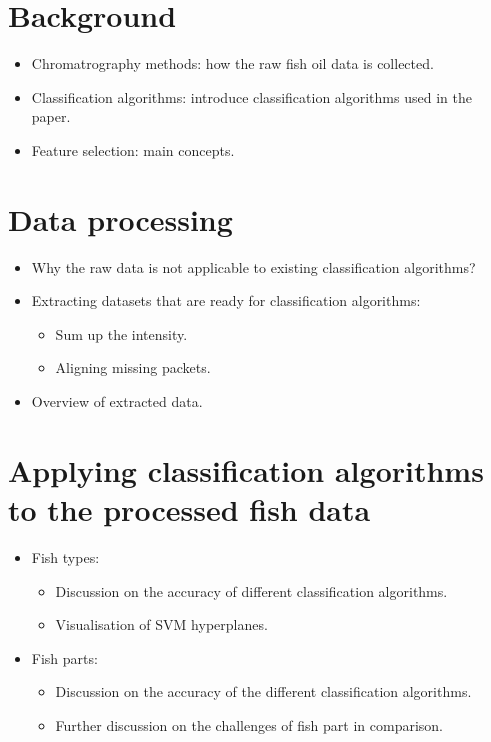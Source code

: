 \documentclass[runningheads]{llncs}
\begin{document}
\section{Background}

\begin{itemize}
    \item Chromatrography methods: how the raw fish oil data is collected. 
    \item Classification algorithms: introduce classification algorithms used in the paper. 
    \item Feature selection: main concepts. 
\end{itemize}

\section{Data processing}

\begin{itemize}
    \item Why the raw data is not applicable to existing classification algorithms? 
    \item Extracting datasets that are ready for classification algorithms: 
    \begin{itemize}
        \item Sum up the intensity. 
        \item Aligning missing packets. 
    \end{itemize}
    \item Overview of extracted data.
\end{itemize}

\section{Applying classification algorithms to the processed fish data}

\begin{itemize}
    \item Fish types: 
    \begin{itemize}
        \item Discussion on the accuracy of different classification algorithms. 
        \item Visualisation of SVM hyperplanes. 
    \end{itemize}
    \item Fish parts: 
    \begin{itemize}
        \item Discussion on the accuracy of the different classification algorithms. 
        \item Further discussion on the challenges of fish part in comparison. 
    \end{itemize}
\end{itemize}
\end{document}
